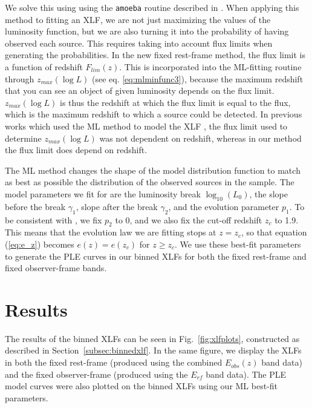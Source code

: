 \documentclass[fleqn,usenatbib]{mnras}
\begin{document}
	We solve this using using the \texttt{amoeba} routine described in \cite{press1997numrecipe}. When applying this method to fitting an XLF, we are not just maximizing the values of the luminosity function, but we are also turning it into the probability of having observed each source. 
	This requires taking into account flux limits when generating the probabilities.
	In the new fixed rest-frame method, the flux limit is a function of redshift $F_{lim}(z)$. 
	This is incorporated into the ML-fitting routine through $z_{max}(\log L)$ (see eq. \ref{eq:mlminfunc3}), because the maximum redshift that you can see an object of given luminosity depends on the flux limit.
	$z_{max}(\log L)$ is thus the redshift at which the flux limit is equal to the flux, which is the maximum redshift to which a source could be detected.
	In previous works which used the ML method to model the XLF \citep[e.g.][]{ebrero2009xmm,ueda2014evo}, the flux limit used to determine $z_{max}(\log L)$ was not dependent on redshift, whereas in our method the flux limit does depend on redshift.
    
    The ML method changes the shape of the model distribution function to match as best as possible the distribution of the observed sources in the sample.
    The model parameters we fit for are the luminosity break $\log_{10}(L_{0})$, the slope before the break $\gamma_{1}$, slope after the break $\gamma_{2}$, and the evolution parameter $p_{1}$. 
    To be consistent with \cite{ebrero2009xmm}, we fix $p_{2}$ to 0, and we also fix the cut-off redshift $z_{c}$ to 1.9.
    This means that the evolution law we are fitting stops at $z = z_c$, so that equation (\ref{eq:e_z}) becomes $e(z) = e(z_{c})$ for $z \geq z_{c}$.
    We use these best-fit parameters to generate the PLE curves in our binned XLFs for both the fixed rest-frame and fixed observer-frame bands. 
    




\section{Results}\label{sec:results}

The results of the binned XLFs can be seen in Fig.~\ref{fig:xlfplots}, constructed as described in Section~\ref{subsec:binnedxlf}. 
In the same figure, we display the XLFs in both the fixed rest-frame (produced using the combined $E_{obs}(z)$ band data) and the fixed observer-frame (produced using the $E_{rf}$ band data).
The PLE model curves were also plotted on the binned XLFs using our ML best-fit parameters.
\end{document}
